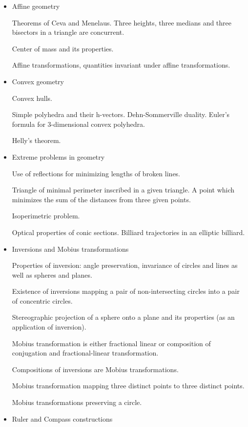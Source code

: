\begin{itemize}
\item Affine geometry

Theorems of Ceva and Menelaus. {\color{light-gray} Three heights, three
medians and three bisectors in a triangle are concurrent.}

Center of mass and its properties.

Affine transformations, quantities invariant under affine transformations.

\item {\color{light-gray}Convex geometry

Convex hulls.

Simple polyhedra and their h-vectors. Dehn-Sommerville duality. Euler's formula for
3-dimensional convex polyhedra.

Helly's theorem.}

\item Extreme problems in geometry

Use of reflections for minimizing lengths of broken lines. {\color{light-gray}Triangle of minimal perimeter inscribed in a given triangle. A point which minimizes the sum of the distances from three given points.

Isoperimetric problem.}

Optical properties of conic sections. Billiard trajectories in an elliptic billiard.

\item Inversions and Mobius transformations

Properties of inversion: angle preservation, invariance of circles and lines as well as spheres and planes.

Existence of inversions mapping a pair of non-intersecting circles into a pair of concentric circles.

{\color{light-gray}Stereographic projection of a sphere onto a plane and its properties (as an application of inversion).}

Mobius transformation is either fractional linear or composition of conjugation and fractional-linear transformation.

Compositions of inversions are Mobius transformations.

Mobius transformation mapping three distinct points to three distinct points.

{\color{light-gray}Mobius transformations preserving a circle.}

\item Ruler and Compass constructions


\end{itemize}
